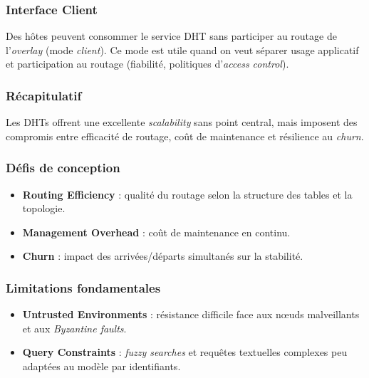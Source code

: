 \subsubsection*{Interface Client}
Des h\^otes peuvent consommer le service DHT sans participer au routage de l'\emph{overlay} (mode \emph{client}).
Ce mode est utile quand on veut s\'eparer usage applicatif et participation au routage (fiabilit\'e, politiques d'\emph{access control}).

\subsubsection{R\'ecapitulatif}

Les DHTs offrent une excellente \emph{scalability} sans point central, mais imposent des compromis entre efficacit\'e de routage, co\^ut de maintenance et r\'esilience au \emph{churn}.

\subsubsection*{D\'efis de conception}
\begin{itemize}
\item \textbf{Routing Efficiency} : qualit\'e du routage selon la structure des tables et la topologie.
\item \textbf{Management Overhead} : co\^ut de maintenance en continu.
\item \textbf{Churn} : impact des arriv\'ees/d\'eparts simultan\'es sur la stabilit\'e.
\end{itemize}

\subsubsection*{Limitations fondamentales}
\begin{itemize}
\item \textbf{Untrusted Environments} : r\'esistance difficile face aux n\oe uds malveillants et aux \emph{Byzantine faults}.
\item \textbf{Query Constraints} : \emph{fuzzy searches} et requ\^etes textuelles complexes peu adapt\'ees au mod\`ele par identifiants.
\end{itemize}
